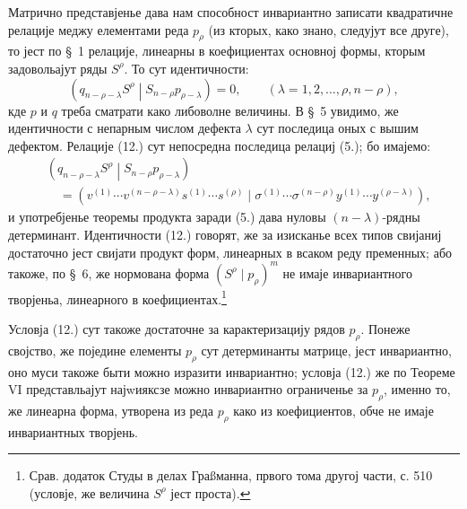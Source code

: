 ﻿\documentclass[11pt]{article}
\newcommand{\pair}[2]{\left(#1\middle|#2\right)}
\begin{document}
Матрично представјенье дава нам способност инвариантно записати квадратичне релације меджу елементами реда $p_\rho$ (из кторых, како знано, следујут все друге), то јест по \S\ 1 релације, линеарны в коефициентах основној формы, кторым задовольајут ряды $S^\rho$. То сут идентичности:
\begin{equation}
 \pair{q_{n-\rho-\lambda}S^\rho}{S_{n-\rho}p_{\rho-\lambda}}=0,
 \qquad (\lambda=1,2,\ldots,\rho,n-\rho),
\tag{12}
\end{equation}
кде $p$ и $q$ треба сматрати како либоволне величины. В \S\ 5 увидимо, же идентичности с непарным числом дефекта $\lambda$ сут последица оных с вышим дефектом. Релације (12.) сут непосредна последица релациј (5.); бо имајемо:
\[
\begin{aligned}
&\pair{q_{n-\rho-\lambda}S^\rho}{S_{n-\rho}p_{\rho-\lambda}}\\
&\quad
=(v^{(1)}\cdots v^{(n-\rho-\lambda)}s^{(1)}\cdots s^{(\rho)}
\mid \sigma^{(1)}\cdots\sigma^{(n-\rho)}y^{(1)}\cdots y^{(\rho-\lambda)}),
\end{aligned}
\]
и употребјенье теоремы продукта заради (5.) дава нуловы $(n-\lambda)$-рядны детерминант. Идентичности (12.) говорят, же за изисканье всех типов свијаниј достаточно јест свијати продукт форм, линеарных в всаком реду пременных; або такоже, по \S\ 6, же нормована форма $(S^\rho\mid p_\rho)^m$ не имаје инвариантного творјеньа, линеарного в коефициентах.\footnote{Срав. додаток Студы в делах Граßманна, првого тома другој части, с. 510 (условје, же величина $S^\rho$ јест проста).}

Условја (12.) сут такоже достаточне за карактеризацију рядов $p_\rho$. Понеже својство, же поједине елементы $p_\rho$ сут детерминанты матрице, јест инвариантно, оно муси такоже быти можно изразити инвариантно; условја (12.) же по Теореме VI представльајут најwияксзе можно инвариантно ограниченье за $p_\rho$, именно то, же линеарна форма, утворена из реда $p_\rho$ како из коефициентов, обче не имаје инвариантных творјень.
\end{document}
